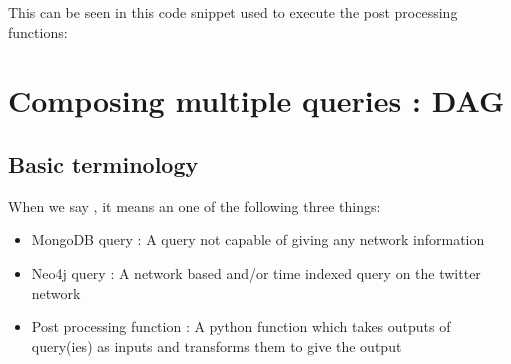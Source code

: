 \documentclass[letterpaper,10pt,english]{sphinxmanual}
\begin{document}
This can be seen in this code snippet used to execute the post processing functions:

\begin{sphinxVerbatim}[commandchars=\\\{\}]
  
         
       
        \PYG{p}{[}\PYG{p}{]}  \PYG{p}{[}\PYG{p}{]}
   
\end{sphinxVerbatim}


\chapter{Composing multiple queries : DAG}
\label{\detokenize{dag:composing-multiple-queries-dag}}\label{\detokenize{dag::doc}}

\section{Basic terminology}
\label{\detokenize{dag:basic-terminology}}
When we say , it means an one of the following three things:
\begin{itemize}
\item {} 
MongoDB query : A query not capable of giving any network information

\item {} 
Neo4j query : A network based and/or time indexed query on the twitter network

\item {} 
Post processing function : A python function which takes outputs of query(ies) as inputs and transforms them to give the output

\end{itemize}
\end{document}
